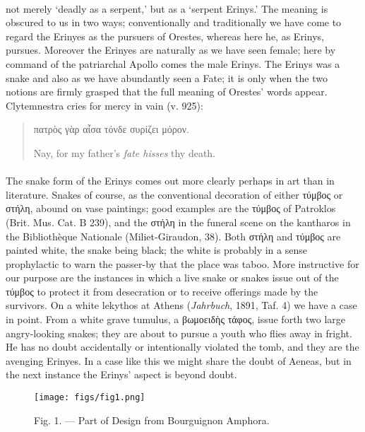 \documentclass[a4paper, 11pt, oneside, polutonikogreek, english]{article}
\begin{document}
\paragraph{}
not merely `deadly as a serpent,' but as a `serpent Erinys.' The meaning is obscured to us in two ways; conventionally and traditionally we have come to regard the Erinyes as the pursuers of Orestes, whereas here he, as Erinys, pursues. Moreover the Erinyes are naturally as we have seen female; here by command of the patriarchal Apollo comes the male Erinys. The Erinys was a snake and also as we have abundantly seen a Fate; it is only when the two notions are firmly grasped that the full meaning of Orestes' words appear. Clytemnestra cries for mercy in vain (v. 925):
\begin{quotation}
πατρὸς γὰρ αἶσα τόνδε συρίζει μόρον.

Nay, for my father's \emph{fate hisses} thy death.
\end{quotation}
\paragraph{}
The snake form of the Erinys comes out more clearly perhaps in art than in literature. Snakes of course, as the conventional decoration of either τύμβος or στήλη, abound on vase paintings; good examples are the τύμβος of Patroklos (Brit. Mus. Cat. B 239), and the στήλη in the funeral scene on the kantharos in the Bibliothèque Nationale (Miliet-Giraudon, 38). Both στήλη and τύμβος are painted white, the snake being black; the white is probably in a sense prophylactic to warn the passer-by that the place was taboo. More instructive for our purpose are the instances in which a live snake or snakes issue out of the τύμβος to protect it from desecration or to receive offerings made by the survivors. On a white lekythos at Athens (\emph{Jahrbuch}, 1891, Taf. 4) we have a case in point. From a white grave tumulus, a βωμοειδὴς τάφος, issue forth two large angry-looking snakes; they are about to pursue a youth who flies away in fright. He has no doubt accidentally or intentionally violated the tomb, and they are the avenging Erinyes. In a case like this we might share the doubt of Aeneas, but in the next instance the Erinys' aspect is beyond doubt.
\begin{figure}[H]
\centering
\texttt{[image: figs/fig1.png]}
\caption{\Fontauri Fig. 1. --- Part of Design from Bourguignon Amphora.}
\end{figure}
\end{document}
